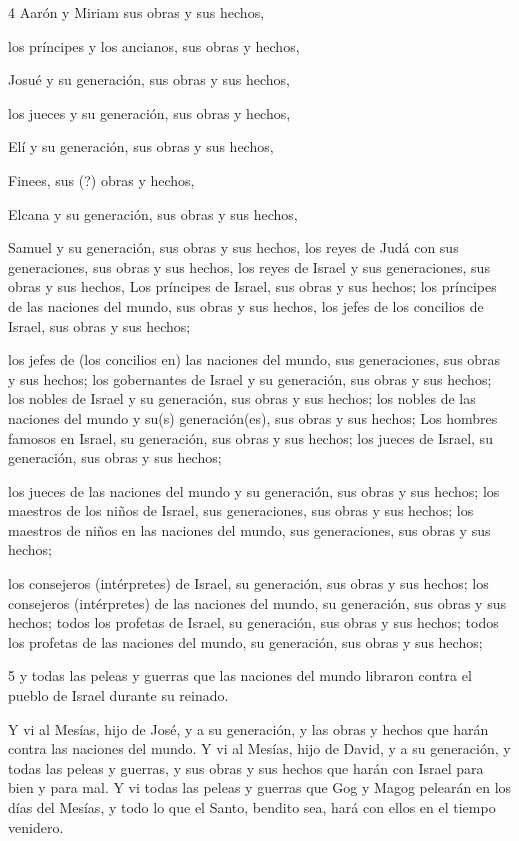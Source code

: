 \par 4 Aarón y Miriam sus obras y sus hechos,
\par los príncipes y los ancianos, sus obras y hechos,
\par Josué y su generación, sus obras y sus hechos,
\par los jueces y su generación, sus obras y hechos,
\par Elí y su generación, sus obras y sus hechos,
\par Finees, sus (?) obras y hechos,
\par Elcana y su generación, sus obras y sus hechos,
\par Samuel y su generación, sus obras y sus hechos,
los reyes de Judá con sus generaciones, sus obras y sus hechos,
los reyes de Israel y sus generaciones, sus obras y sus hechos,
Los príncipes de Israel, sus obras y sus hechos; los príncipes de las naciones del mundo, sus obras y sus hechos,
los jefes de los concilios de Israel, sus obras y sus hechos;
\par los jefes de (los concilios en) las naciones del mundo, sus generaciones, sus obras y sus hechos;
los gobernantes de Israel y su generación, sus obras y sus hechos;
los nobles de Israel y su generación, sus obras y sus hechos; los nobles de las naciones del mundo y su(s) generación(es), sus obras y sus hechos;
Los hombres famosos en Israel, su generación, sus obras y sus hechos;
los jueces de Israel, su generación, sus obras y sus hechos;
\par los jueces de las naciones del mundo y su generación, sus obras y sus hechos;
los maestros de los niños de Israel, sus generaciones, sus obras y sus hechos; los maestros de niños en las naciones del mundo, sus generaciones, sus obras y sus hechos;
\par los consejeros (intérpretes) de Israel, su generación, sus obras y sus hechos; los consejeros (intérpretes) de las naciones del mundo, su generación, sus obras y sus hechos;
todos los profetas de Israel, su generación, sus obras y sus hechos; todos los profetas de las naciones del mundo, su generación, sus obras y sus hechos;

\par 5 y todas las peleas y guerras que las naciones del mundo libraron contra el pueblo de Israel durante su reinado.

Y vi al Mesías, hijo de José, y a su generación, y las obras y hechos que harán contra las naciones del mundo. Y vi al Mesías, hijo de David, y a su generación, y todas las peleas y guerras, y sus obras y sus hechos que harán con Israel para bien y para mal. Y vi todas las peleas y guerras que Gog y Magog pelearán en los días del Mesías, y todo lo que el Santo, bendito sea, hará con ellos en el tiempo venidero.


